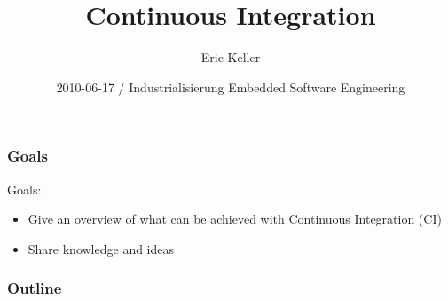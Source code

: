 \documentclass{beamer}
\title[Industrialisierung Embedded Software Engineering: CI]{Continuous
Integration}
\author{Eric Keller}
\institute[HAMILTON-Medical AG]
{
HAMILTON-Medical AG\\
}
\date{2010-06-17 / Industrialisierung Embedded Software Engineering}
\begin{document}
{
\begin{frame}[shadow=false]
\titlepage
\end{frame}
}
\begin{frame}
\frametitle{Goals}
Goals:
\begin{itemize}
  \item<1-> Give an overview of what can be achieved with Continuous Integration
  (CI)
  \item<2-> Share knowledge and ideas
\end{itemize}
\end{frame}

\begin{frame}
\frametitle{Outline}
\tableofcontents[pausesections]
\end{frame}

\end{document}
